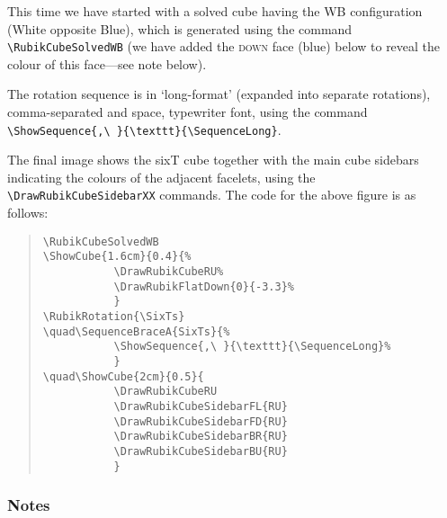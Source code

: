 \documentclass[a4paper]{article}
\begin{document}
\bigskip

\noindent\hfil%
\RubikCubeSolvedWB
{}
\RubikRotation{\sixts}
\quad{}
\quad{}

\hfil

\bigskip

This time we have started with a solved cube having the WB  configuration 
(White opposite Blue), which is generated  using the command  
\verb!\RubikCubeSolvedWB! 
(we have added the \textsc{down} face (blue) below to reveal the colour of this 
face---see note below). 

The rotation  sequence is   in `long-format' (expanded into 
separate rotations), comma-separated and space,  typewriter font,  
using the command \verb!\ShowSequence{,\ }{\texttt}{\SequenceLong}!.

The final image shows the sixT cube  together with the main cube sidebars 
 indicating the colours of the  adjacent facelets, 
using the \verb!\DrawRubikCubeSidebarXX! commands. 
The code for the above figure is as follows:

\begin{quote}
\begin{verbatim}
\RubikCubeSolvedWB
\ShowCube{1.6cm}{0.4}{%
           \DrawRubikCubeRU%
           \DrawRubikFlatDown{0}{-3.3}%
           }
\RubikRotation{\SixTs}
\quad\SequenceBraceA{SixTs}{%
           \ShowSequence{,\ }{\texttt}{\SequenceLong}%
           }
\quad\ShowCube{2cm}{0.5}{
           \DrawRubikCubeRU
           \DrawRubikCubeSidebarFL{RU}
           \DrawRubikCubeSidebarFD{RU}
           \DrawRubikCubeSidebarBR{RU}
           \DrawRubikCubeSidebarBU{RU}
           }
\end{verbatim} 
\end{quote}



\subsubsection*{Notes}
\end{document}

